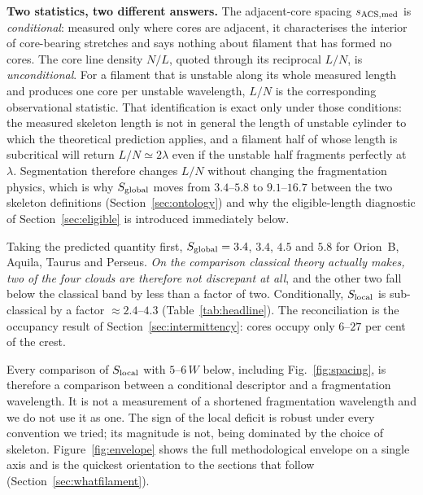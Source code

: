 \documentclass[usenatbib,twoside,twocolumn]{mnras}
\begin{document}
\smallskip\noindent\textbf{Two statistics, two different answers.} The adjacent-core spacing $s_{\rm ACS,med}$ is \emph{conditional}: measured only where cores are adjacent, it characterises the interior of core-bearing stretches and says nothing about filament that has formed no cores. The core line density $N/L$, quoted through its reciprocal $L/N$, is \emph{unconditional}. For a filament that is unstable along its whole measured length and produces one core per unstable wavelength, $L/N$ is the corresponding observational statistic. That identification is exact only under those conditions: the measured skeleton length is not in general the length of unstable cylinder to which the theoretical prediction applies, and a filament half of whose length is subcritical will return $L/N\simeq2\lambda$ even if the unstable half fragments perfectly at $\lambda$. Segmentation therefore changes $L/N$ without changing the fragmentation physics, which is why $S_{\rm global}$ moves from $3.4$--$5.8$ to $9.1$--$16.7$ between the two skeleton definitions (Section~\ref{sec:ontology}) and why the eligible-length diagnostic of Section~\ref{sec:eligible} is introduced immediately below.

Taking the predicted quantity first, $S_{\rm global}=3.4$, $3.4$, $4.5$ and $5.8$ for Orion~B, Aquila, Taurus and Perseus. \emph{On the comparison classical theory actually makes, two of the four clouds are therefore not discrepant at all}, and the other two fall below the classical band by less than a factor of two. Conditionally, $S_{\rm local}$ is sub-classical by a factor $\approx2.4$--$4.3$ (Table~\ref{tab:headline}). The reconciliation is the occupancy result of Section~\ref{sec:intermittency}: cores occupy only $6$--$27$ per cent of the crest.

Every comparison of $S_{\rm local}$ with $5$--$6\,W$ below, including Fig.~\ref{fig:spacing}, is therefore a comparison between a conditional descriptor and a fragmentation wavelength. It is not a measurement of a shortened fragmentation wavelength and we do not use it as one. The sign of the local deficit is robust under every convention we tried; its magnitude is not, being dominated by the choice of skeleton. Figure~\ref{fig:envelope} shows the full methodological envelope on a single axis and is the quickest orientation to the sections that follow (Section~\ref{sec:whatfilament}).
\end{document}
